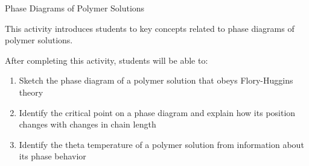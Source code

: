 %
%
%
%

\renewcommand{\figpath}{content/polymphys/solution-thermo/phase-diagrams/figs}
\renewcommand{\labelbase}{phase-diagrams}

\begin{activity}{Phase Diagrams of Polymer Solutions}

\begin{instructornotes}

	This activity introduces students to key concepts related to phase diagrams of polymer solutions.
	
	After completing this activity, students will be able to:
			\begin{enumerate}
				\item Sketch the phase diagram of a polymer solution that obeys Flory-Huggins theory
				\item Identify the critical point on a phase diagram and explain how its position changes with changes in chain length
				\item Identify the theta temperature of a polymer solution from information about its phase behavior
			\end{enumerate}
			

\end{instructornotes}
\end{activity}
